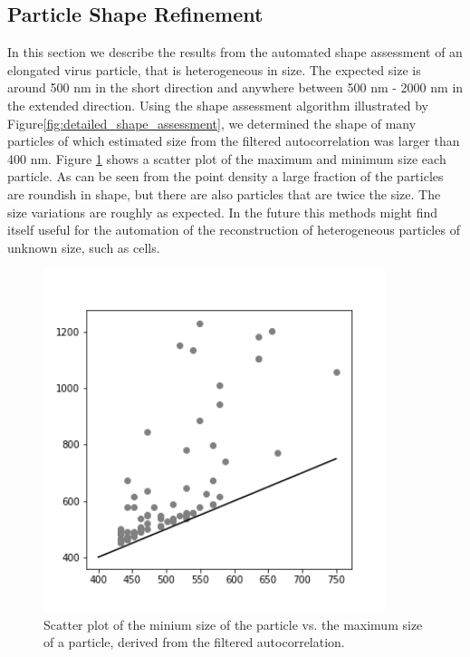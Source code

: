 \subsection{Particle Shape Refinement}

In this section we describe the results from the automated shape assessment of an elongated virus particle, that is heterogeneous in size. The expected size is around 500 nm in the short direction and anywhere between 500 nm - 2000 nm in the extended direction. Using the shape assessment algorithm illustrated by Figure\ref{fig:detailed_shape_assessment}, we determined the shape of many particles of which estimated size from the filtered autocorrelation was larger than 400 nm. Figure \ref{fig:majorminor} shows a scatter plot of the maximum and minimum size each particle. As can be seen from the point density a large fraction of the particles are roundish in shape, but there are also particles that are twice the size. The size variations are roughly as expected. In the future this methods might find itself useful for the automation of the reconstruction of heterogeneous particles of unknown size, such as cells.

\begin{figure}[!ht]
\centering
\includegraphics[width=100mm]{Chapter_09_Results_Refined_Sizing.png}
\caption{Scatter plot of the minium size of the particle vs. the maximum size of a particle, derived from the filtered autocorrelation. }\label{fig:majorminor}

\end{figure}




